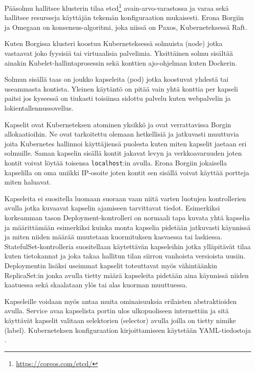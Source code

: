 \documentclass[finnish]{tktltiki2}
\theoremstyle{definition}
\theoremstyle{remark}
\begin{document}
Pääsolmu hallitsee klusterin tilaa etcd\footnote{\url{https://coreos.com/etcd/}} avain-arvo-varastossa ja varaa sekä hallitsee resursseja käyttäjän tekemän konfiguraation mukaisesti. Erona Borgiin ja Omegaan on konsensus-algoritmi, joka niissä on Paxos, Kuberneteksessä Raft.

Kuten Borgissa klusteri koostuu Kuberneteksessä solmuista (node) jotka vastaavat joko fyysisiä tai virtuaalisia palvelimia. Yksittäinen solmu sisältää ainakin Kubelet-hallintaprosessin sekä konttien ajo-ohjelman kuten Dockerin.

Solmun sisällä taas on joukko kapseleita (pod) jotka koostuvat yhdestä tai useammasta kontista. Yleinen käytäntö on pitää vain yhtä konttia per kapseli paitsi jos kyseessä on tiukasti toisiinsa sidottu palvelu kuten webpalvelin ja lokientallennussovellus.

Kapselit ovat Kuberneteksen atominen yksikkö ja ovat verrattavissa Borgin allokaatioihin. Ne ovat tarkoitettu olemaan hetkellisiä ja jatkuvasti muuttuvia joita Kubernetes hallinnoi käyttäjiensä puolesta kuten miten kapselit jaetaan eri solmuille. Saman kapselin sisällä kontit jakavat levyn ja verkkoavaruuden joten kontit voivat löytää toisensa \texttt{localhost}:in avulla. Erona Borgiin jokaisella kapselilla on oma uniikki IP-osoite joten kontit sen sisällä voivat käyttää portteja miten haluavat.

Kapseleita ei suositella luomaan suoraan vaan niitä varten luotujen kontrollerien avulla jotka kuvaavat kapselin ajamiseen tarvittavat tiedot. Esimerkiksi korkeamman tason Deployment-kontrolleri on normaali tapa kuvata yhtä kapselia ja määrittämään esimerkiksi kuinka monta kapselia pidetään jatkuvasti käynnissä ja miten niiden määrää muutetaan kuormituksen kasvaessa tai laskiessa. StatefulSet-kontrolleria suositellaan käytettävän kapseleihin jotka ylläpitävät tilaa kuten tietokannat ja joka takaa hallitun tilan siirron vanhoista versioista uusiin. Deploymentin lisäksi useimmat kapselit toteuttavat myös vähintäänkin ReplicaSet:in jonka avulla tietty määrä kapseleita pidetään aina käynnissä niiden kaatuessa sekä skaalataan ylös tai alas kuorman muuttuessa.

Kapseleille voidaan myös antaa muita ominaisuuksia erilaisten abstraktioiden avulla. Service avaa kapselista portin ulos ulkopuoliseen internettiin ja sitä käyttävät kapselit valitaan selektorien (selector) avulla joilla on tietty nimike (label). Kuberneteksen konfiguraation kirjoittamiseen käytetään YAML-tiedostoja \cite{kubernetes-docs}.
\end{document}
